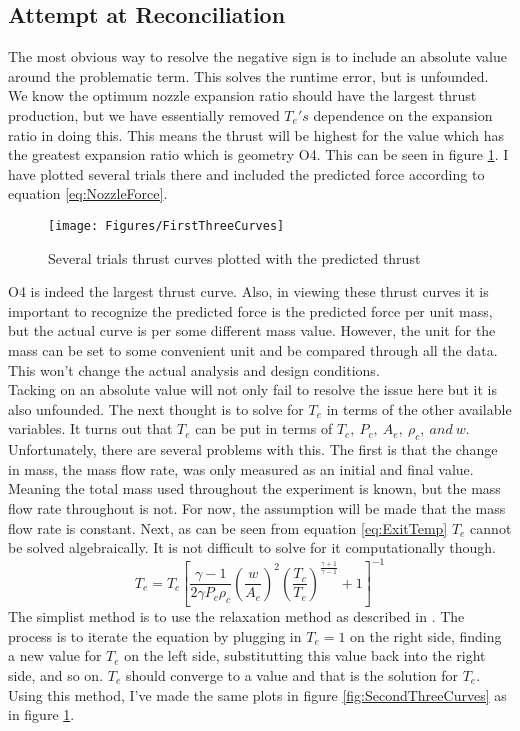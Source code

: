 \subsection{Attempt at Reconciliation}
The most obvious way to resolve the negative sign is to include an absolute value around the problematic term. This solves the runtime error, but is unfounded. We know the optimum nozzle expansion ratio should have the largest thrust production, but we have essentially removed $T_e's$ dependence on the expansion ratio in doing this. This means the thrust will be highest for the value which has the greatest expansion ratio which is geometry O4. This can be seen in figure \ref{fig:FirstThreeCurves}. I have plotted several trials there and included the predicted force according to equation \ref{eq:NozzleForce}.
\begin{figure}[h!]
\centering
\texttt{[image: Figures/FirstThreeCurves]}
\caption{Several trials thrust curves plotted with the predicted thrust}
\label{fig:FirstThreeCurves}
\end{figure}
O4 is indeed the largest thrust curve. Also, in viewing these thrust curves it is important to recognize the predicted force is the predicted force per unit mass, but the actual curve is per some different mass value. However, the unit for the mass can be set to some convenient unit and be compared through all the data. This won't change the actual analysis and design conditions.\\
Tacking on an absolute value will not only fail to resolve the issue here but it is also unfounded. The next thought is to solve for $T_e$ in terms of the other available variables. It turns out that $T_e$ can be put in terms of $T_c,\ P_c,\ A_e,\ \rho_c,\ and\ w$.%
Unfortunately, there are several problems with this. The first is that the change in mass, the mass flow rate, was only measured as an initial and final value. Meaning the total mass used throughout the experiment is known, but the mass flow rate throughout is not. For now, the assumption will be made that the mass flow rate is constant. Next, as can be seen from equation \ref{eq:ExitTemp} $T_e$ cannot be solved algebraically. It is not difficult to solve for it computationally though. 
\begin{equation}\label{eq:ExitTemp}
T_e = T_c\left[\frac{\gamma -1}{2\gamma P_c \rho_c} \left(\frac{w}{A_e}\right)^2\left(\frac{T_c}{T_e}\right)^{\frac{\gamma+1}{\gamma-1}}+1\right]^{-1}
\end{equation}
The simplist method is to use the relaxation method as described in \cite{newman}. The process is to iterate the equation by plugging in $T_e=1$ on the right side, finding a new value for $T_e$ on the left side, substitutting this value back into the right side, and so on. $T_e$ should converge to a value and that is the solution for $T_e$. Using this method, I've made the same plots in figure \ref{fig:SecondThreeCurves} as in figure \ref{fig:FirstThreeCurves}.

